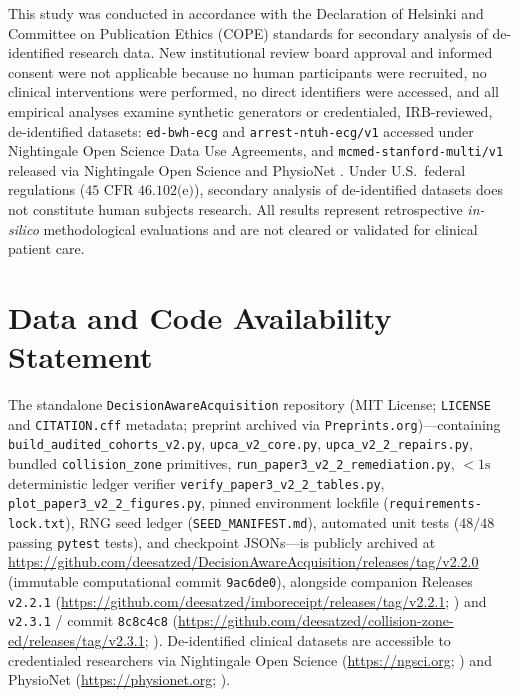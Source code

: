 \documentclass[11pt]{article}
\theoremstyle{remark}
\begin{document}
This study was conducted in accordance with the Declaration of Helsinki and Committee on Publication Ethics (COPE) standards for secondary analysis of de-identified research data. New institutional review board approval and informed consent were not applicable because no human participants were recruited, no clinical interventions were performed, no direct identifiers were accessed, and all empirical analyses examine synthetic generators or credentialed, IRB-reviewed, de-identified datasets: \texttt{ed-bwh-ecg} \citep{mullainathan2022diagnosing} and \texttt{arrest-ntuh-ecg/v1} \citep{obermeyer2026ecg} accessed under Nightingale Open Science Data Use Agreements, and \texttt{mcmed-stanford-multi/v1} \citep{kansal2025mcmed} released via Nightingale Open Science and PhysioNet \citep{goldberger2000physionet}. Under U.S.\ federal regulations ($45\text{ CFR }46.102\text{(e)}$), secondary analysis of de-identified datasets does not constitute human subjects research. All results represent retrospective \emph{in-silico} methodological evaluations and are not cleared or validated for clinical patient care.

\section*{Data and Code Availability Statement}

{\raggedright The standalone \texttt{DecisionAwareAcquisition} repository (MIT License; \texttt{LICENSE} and \texttt{CITATION.cff} metadata; preprint archived via \texttt{Preprints.org})---containing \texttt{build\_audited\_cohorts\_v2.py}, \texttt{upca\_v2\_core.py}, \texttt{upca\_v2\_2\_repairs.py}, bundled \texttt{collision\_zone} primitives, \texttt{run\_paper3\_v2\_2\_remediation.py}, $<1\text{s}$ deterministic ledger verifier \texttt{verify\_paper3\_v2\_2\_tables.py}, \texttt{plot\_paper3\_v2\_2\_figures.py}, pinned environment lockfile (\texttt{requirements-lock.txt}), RNG seed ledger (\texttt{SEED\_MANIFEST.md}), automated unit tests ($48/48$ passing \texttt{pytest} tests), and checkpoint JSONs---is publicly archived at \url{https://github.com/deesatzed/DecisionAwareAcquisition/releases/tag/v2.2.0} (immutable computational commit \texttt{9ac6de0}), alongside companion Releases \texttt{v2.2.1} (\url{https://github.com/deesatzed/imboreceipt/releases/tag/v2.2.1}; \citealp{satz2026pilot}) and \texttt{v2.3.1} / commit \texttt{8c8c4c8} (\url{https://github.com/deesatzed/collision-zone-ed/releases/tag/v2.3.1}; \citealp{satz2026collision}). De-identified clinical datasets are accessible to credentialed researchers via Nightingale Open Science (\url{https://ngsci.org}; \citealp{nightingale2024platform}) and PhysioNet (\url{https://physionet.org}; \citealp{kansal2025mcmed,goldberger2000physionet}).\par}
\end{document}
